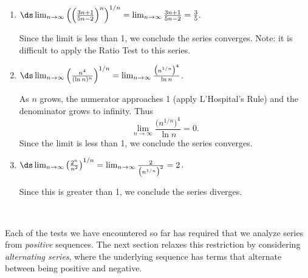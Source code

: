 {\begin{enumerate}
	\item $\ds\lim_{n\to\infty} \left(\left(\frac{3n+1}{5n-2}\right)^n\right)^{1/n} = \lim_{n\to\infty} \frac{3n+1}{5n-2} = \frac 35.$ 
	
	Since the limit is less than 1, we conclude the series converges. Note: it is difficult to apply the Ratio Test to this series.
	
	\item		$\ds\lim_{n\to\infty} \left(\frac{n^4}{(\ln n)^n}\right)^{1/n} = \lim_{n\to\infty} \frac {\big(n^{1/n}\big)^4}{\ln n}  $. 
	
	As $n$ grows, the numerator approaches 1 (apply L'Hospital's Rule) and the denominator 
	grows to infinity.  Thus 
\[
\lim_{n\to\infty} \frac{\big(n^{1/n}\big)^4}{\ln n} = 0.
\]
Since the limit is less than 1, we conclude the series converges.
	
	\item		$\ds \lim_{n\to\infty} \left(\frac{2^n}{n^2}\right)^{1/n} = \lim_{n\to\infty} \frac{2}{\big(n^{1/n}\big)^2} = 2$. 
	
	Since this is greater than 1, we conclude the series diverges.
\end{enumerate}
\baselineskip
}\\
\enlargethispage{\baselineskip}

Each of the tests we have encountered so far has required that we analyze series from \emph{positive} sequences. The next section relaxes this restriction by  considering \emph{alternating series}, where the underlying sequence has terms that alternate between being positive and negative.



